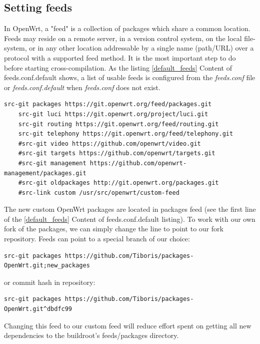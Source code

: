 \subsection{Setting feeds}

In OpenWrt, a "feed" is a collection of packages which share a common location.
Feeds may reside on a remote server, in a version control system, on the local file-system, or in any other location addressable by a single name (path/URL) over a protocol with a supported feed method.
It is the most important step to do before starting cross-compilation.
As the listing \ref{default_feeds} Content of feeds.conf.default shows, a list of usable feeds is configured from the {\it feeds.conf} file or {\it feeds.conf.default} when {\it feeds.conf} does not exist.

\begin{lstlisting}[columns=fixed,basicstyle=\ttfamily\footnotesize,tabsize=4,label=default_feeds,caption=Content of feeds.conf.default]
    src-git packages https://git.openwrt.org/feed/packages.git
    src-git luci https://git.openwrt.org/project/luci.git
    src-git routing https://git.openwrt.org/feed/routing.git
    src-git telephony https://git.openwrt.org/feed/telephony.git
    #src-git video https://github.com/openwrt/video.git
    #src-git targets https://github.com/openwrt/targets.git
    #src-git management https://github.com/openwrt-management/packages.git
    #src-git oldpackages http://git.openwrt.org/packages.git
    #src-link custom /usr/src/openwrt/custom-feed
\end{lstlisting}

The new custom OpenWrt packages are located in packages feed (see the first line of the \ref{default_feeds} Content of feeds.conf.default listing).
To work with our own fork of the packages, we can simply change the line to point to our fork repository.
Feeds can point to a special branch of our choice:
\begin{lstlisting}[columns=fixed,basicstyle=\ttfamily\footnotesize,tabsize=4,backgroundcolor=\color{yellow!10}]
src-git packages https://github.com/Tiboris/packages-OpenWrt.git;new_packages
\end{lstlisting}
or commit hash in repository:
\begin{lstlisting}[columns=fixed,basicstyle=\ttfamily\footnotesize,tabsize=4,backgroundcolor=\color{yellow!10}]
src-git packages https://github.com/Tiboris/packages-OpenWrt.git^dbdfc99
\end{lstlisting}
Changing this feed to our custom feed will reduce effort spent on getting all new dependencies to the buildroot's feeds/packages directory. %

